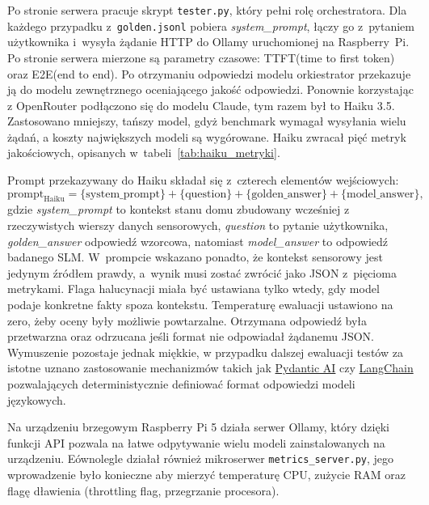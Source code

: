 Po stronie serwera pracuje skrypt \texttt{tester.py}, który pełni rolę orchestratora. Dla
każdego przypadku z~\texttt{golden.jsonl} pobiera \emph{system\_prompt},
łączy go z~pytaniem użytkownika i~wysyła żądanie HTTP do Ollamy uruchomionej
na Raspberry~Pi. Po stronie serwera mierzone są parametry czasowe: TTFT(time to first token) oraz E2E(end to end). Po otrzymaniu odpowiedzi modelu
orkiestrator przekazuje ją do modelu zewnętrznego oceniającego jakość odpowiedzi. Ponownie korzystając z OpenRouter podłączono się do modelu Claude, tym razem był to Haiku 3.5. Zastosowano mniejszy, tańszy model, gdyż benchmark wymagał wysyłania wielu żądań, a koszty największych modeli są wygórowane. Haiku zwracał pięć metryk jakościowych, opisanych w~tabeli~\ref{tab:haiku_metryki}.

Prompt przekazywany do Haiku składał się z~czterech elementów wejściowych:
\begin{equation}
  \label{eq:haiku_prompt}
  \mathrm{prompt}_{\mathrm{Haiku}}
  =
  \{\mathrm{system\_prompt}\}
  +
  \{\mathrm{question}\}
  +
  \{\mathrm{golden\_answer}\}
  +
  \{\mathrm{model\_answer}\},
\end{equation}
\noindent
gdzie \emph{system\_prompt} to kontekst stanu domu zbudowany wcześniej
z rzeczywistych wierszy danych sensorowych, \emph{question} to pytanie użytkownika, \emph{golden\_answer}
odpowiedź wzorcowa, natomiast \emph{model\_answer} to odpowiedź badanego SLM.
W~prompcie wskazano ponadto, że kontekst sensorowy jest jedynym źródłem
prawdy, a~wynik musi zostać zwrócić jako JSON z~pięcioma metrykami. Flaga halucynacji miała być ustawiana tylko wtedy, gdy model
podaje konkretne fakty spoza kontekstu. Temperaturę ewaluacji ustawiono
na zero, żeby oceny były możliwie powtarzalne. Otrzymana odpowiedź była przetwarzna oraz odrzucana jeśli format nie odpowiadał żądanemu JSON. Wymuszenie pozostaje jednak miękkie, w przypadku dalszej ewaluacji testów za istotne uznano zastosowanie mechanizmów takich jak \href{https://ai.pydantic.dev/output/}{Pydantic AI} czy \href{https://docs.langchain.com/oss/python/langchain/structured-output}{LangChain} pozwalających deterministycznie definiować format odpowiedzi modeli językowych.

Na urządzeniu brzegowym Raspberry Pi 5 działa serwer Ollamy, który dzięki funkcji API pozwala na łatwe odpytywanie wielu modeli zainstalowanych na urządzeniu. Eównolegle działał również mikroserwer \texttt{metrics\_server.py}, jego wprowadzenie było konieczne aby mierzyć temperaturę CPU, zużycie RAM oraz flagę dławienia (throttling flag, przegrzanie procesora).


